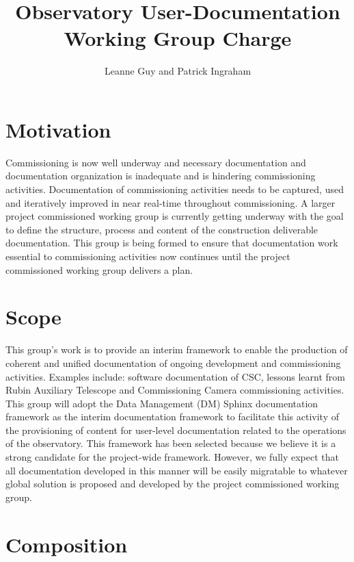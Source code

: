 \documentclass[TS,authoryear,toc]{lsstdoc}
\title{Observatory User-Documentation Working Group Charge}
\author{%
Leanne Guy and Patrick Ingraham
}
\date{\vcsDate}
\begin{document}
\maketitle



\section{Motivation}

Commissioning is now well underway and necessary documentation and documentation organization is inadequate and is hindering commissioning activities. Documentation of commissioning activities needs to be captured, used and iteratively improved in near real-time throughout commissioning. A larger  project commissioned working group is currently getting underway with the goal to define the structure, process and content of the construction deliverable documentation. This group is being formed to ensure that documentation work essential to commissioning activities now continues until the project commissioned working group delivers a plan. 

\section{Scope}
This group's work is to provide an interim framework to enable the production of coherent and unified documentation of ongoing development and commissioning activities. Examples include: software documentation of CSC, lessons learnt from Rubin Auxiliary Telescope and Commissioning Camera commissioning activities. This group will adopt the Data Management (DM) Sphinx documentation framework as the interim documentation framework to facilitate this activity of the provisioning of content for user-level documentation related to the operations of the observatory. This framework has been selected because we believe it is a strong candidate for the project-wide framework. However, we fully expect that all documentation developed in this manner will be easily migratable to whatever global solution is proposed and developed by the project commissioned working group. 

\section{Composition}
\end{document}
